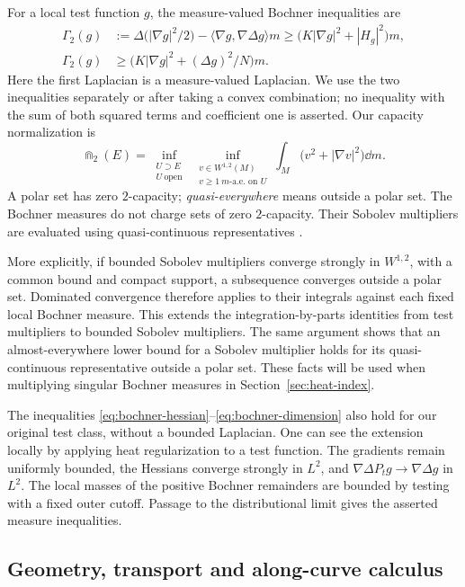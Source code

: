 For a local test function \(g\), the measure-valued Bochner
inequalities are
\begin{align}
\label{eq:bochner-hessian}
\Gamma_2(g)
&:=\Delta\bigl(|\nabla g|^2/2\bigr)
-\langle\nabla g,\nabla\Delta g\rangle m
\ge \bigl(K|\nabla g|^2+|H_g|^2\bigr)m,\\
\label{eq:bochner-dimension}
\Gamma_2(g)&\ge
\bigl(K|\nabla g|^2+(\Delta g)^2/N\bigr)m.
\end{align}
Here the first Laplacian is a measure-valued Laplacian.
We use the two inequalities separately or after taking a convex
combination; no inequality with the sum of both squared terms
and coefficient one is asserted.
Our capacity normalization is
\[
\Cap_2(E)=
\inf_{\substack{U\supset E\\U\ \mathrm{open}}}
\ \inf_{\substack{v\in W^{1,2}(M)\\v\ge1\ m\text{-a.e.\ on }U}}
\int_M\bigl(v^2+|\nabla v|^2\bigr)\dd m.
\]
A polar set has zero \(2\)-capacity; \emph{quasi-everywhere} means
outside a polar set.
The Bochner measures do not charge sets of zero \(2\)-capacity.
Their Sobolev multipliers are evaluated using quasi-continuous
representatives \cite[Sections~2.3 and 3.2]{Savare2014}.

More explicitly, if bounded Sobolev multipliers converge strongly
in \(W^{1,2}\), with a common bound and compact support, a
subsequence converges outside a polar set. Dominated convergence
therefore applies to their integrals against each fixed local
Bochner measure. This extends the integration-by-parts identities
from test multipliers to bounded Sobolev multipliers.
The same argument shows that an almost-everywhere lower bound for
a Sobolev multiplier holds for its quasi-continuous representative
outside a polar set. These facts will be used when multiplying
singular Bochner measures in Section~\ref{sec:heat-index}.

The inequalities \eqref{eq:bochner-hessian}--\eqref{eq:bochner-dimension}
also hold for our original test class, without a bounded
Laplacian. One can see the extension locally by applying heat
regularization to a test function. The gradients remain uniformly
bounded, the Hessians converge strongly in \(L^2\), and
\(\nabla\Delta P_tg\to\nabla\Delta g\) in \(L^2\).
The local masses of the positive Bochner remainders are bounded
by testing with a fixed outer cutoff. Passage to the distributional
limit gives the asserted measure inequalities.

\subsection{Geometry, transport and along-curve calculus}

